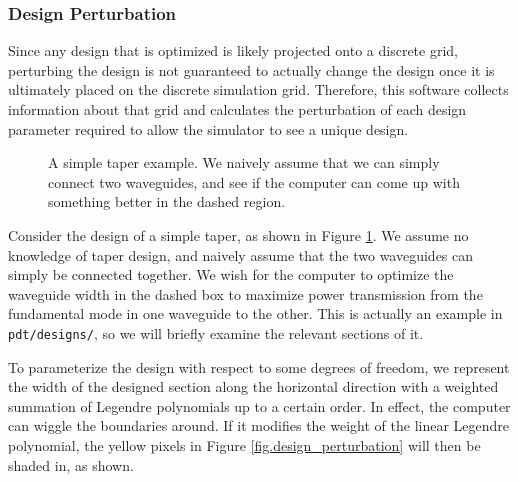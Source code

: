 \documentclass[12pt]{article}
\begin{document}
\subsubsection{Design Perturbation}
Since any design that is optimized is likely projected onto a discrete grid, perturbing the design is not guaranteed to actually change the design once it is ultimately placed on the discrete simulation grid. Therefore, this software collects information about that grid and calculates the perturbation of each design parameter required to allow the simulator to see a unique design.

\begin{figure}
\caption{A simple taper example. We naively assume that we can simply connect two waveguides, and see if the computer can come up with something better in the dashed region.}
\label{fig.toy_taper_example}
\end{figure}

Consider the design of a simple taper, as shown in Figure \ref{fig.toy_taper_example}. We assume no knowledge of taper design, and naively assume that the two waveguides can simply be connected together. We wish for the computer to optimize the waveguide width in the dashed box to maximize power transmission from the fundamental mode in one waveguide to the other. This is actually an example in \texttt{pdt/designs/}, so we will briefly examine the relevant sections of it. 

To parameterize the design with respect to some degrees of freedom, we represent the width of the designed section along the horizontal direction with a weighted summation of Legendre polynomials up to a certain order. In effect, the computer can wiggle the boundaries around. If it modifies the weight of the linear Legendre polynomial, the yellow pixels in Figure \ref{fig.design_perturbation} will then be shaded in, as shown. 
\end{document}
